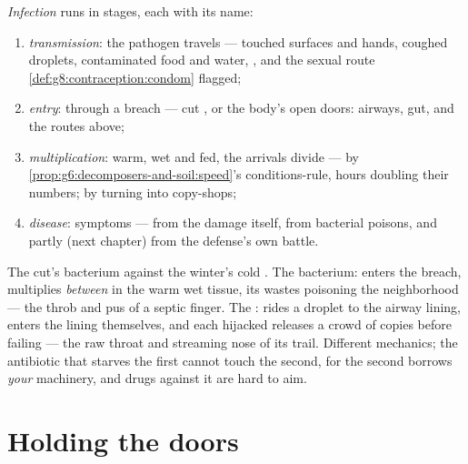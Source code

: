 \begin{definition}\label{def:g9:microbes-and-infection:stages}
\emph{Infection} runs in stages, each
with its name:
\begin{enumerate}
  \item \emph{transmission}: the pathogen travels ---
        touched surfaces and hands, coughed droplets,
        contaminated food and water, , and the
        sexual route \cref{def:g8:contraception:condom}
        flagged;
  \item \emph{entry}: through a breach --- cut , or
        the body's open doors: airways, gut, and the
        routes above;
  \item \emph{multiplication}: warm, wet and fed, the
        arrivals divide ---  by
        \cref{prop:g6:decomposers-and-soil:speed}'s
        conditions-rule, hours doubling their numbers;
         by turning  into copy-shops;
  \item \emph{disease}: symptoms --- from the damage
        itself, from bacterial poisons, and partly (next
        chapter) from the defense's own battle.
\end{enumerate}
\end{definition}

\begin{example}\label{ex:g9:microbes-and-infection:contrast}
The cut's bacterium against the winter's cold .
The bacterium: enters the breach, multiplies \emph{between}
 in the warm wet tissue, its wastes poisoning the
neighborhood --- the throb and pus of a septic finger.
The : rides a droplet to the airway lining, enters
the lining  themselves, and each hijacked 
releases a crowd of copies before failing --- the raw
throat and streaming nose of its trail. Different
mechanics; the antibiotic that starves the first cannot
touch the second, for the second borrows \emph{your}
machinery, and drugs against it are hard to aim.
\end{example}

\section{Holding the doors}

